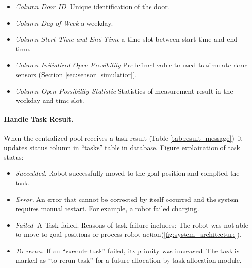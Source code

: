 \begin{table}[htb]
\centering
{}
\caption{Door Open Possibility}
\label{tab:db_open_possibilities}
\begin{itemize}
    \item \textsl{Column Door ID.} Unique identification of the door. 
    \item \textsl{Column Day of Week} a weekday.
    \item \textsl{Column Start Time and End Time} a time slot between start time and end time.
    \item \textsl{Column Initialized Open Possibility} Predefined value to used to simulate door sensors (Section \ref{sec:sensor_simulatior}).
    \item \textsl{Column Open Possibility Statistic} Statistics of measurement result in the weekday and time slot.
\end{itemize}
\end{table}


\paragraph{Handle Task Result.}
When the centralized pool receives a task result (Table \ref{tab:result_message}), it updates status column in ``tasks'' table in database. Figure explaination of task status:

\begin{itemize}
    \item \textsl{Succedded.} Robot successfully moved to the goal position and complted the task.
    \item \textsl{Error.} An error that cannot be corrected by itself occurred and the system requires manual restart. For example, a robot failed charging.
    \item \textsl{Failed.} A Task failed. Reasons of task failure includes: The robot was not able to move to goal positions or process robot action(\ref{fig:system_architecture}). 
    \item \textsl{To rerun.} If an ``execute task'' failed, its priority was increased. The task is marked as ``to rerun task''  for a future allocation by task allocation module.
\end{itemize}


